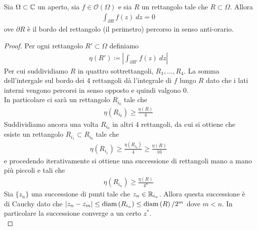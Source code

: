 \begin{theorem}[di Goursat]
	\label{thr:groursat}
	Sia $\Omega \subset \mathbb{C}$ un aperto, sia $f \in \mathcal{O}(\Omega)$ e sia $R$ un rettangolo tale che $R \subset \Omega$. Allora 
	\begin{equation*}
	\begin{aligned}
	\int_{\partial R} f(z)\ dz = 0
	\end{aligned}
	\end{equation*}
	ove $\partial R$ è il bordo del rettangolo (il perimetro) percorso in senso anti-orario.
\end{theorem}
\begin{proof}
	Per ogni rettangolo $R' \subset \Omega$ definiamo 
	\begin{equation*}
	\begin{aligned}
	\eta(R') \coloneqq \left| \int_{\partial R'} f(z)\ dz\right|
	\end{aligned}
	\end{equation*}
	Per cui suddividiamo $R$ in quattro sottrettangoli, $R_1, \dots, R_4$. La somma dell'intergale sul bordo dei 4 rettangoli dà l'integrale di $f$ lungo $R$ dato che i lati interni vengono percorsi in senso opposto e quindi valgono $0$. \\
	In particolare ci sarà un rettangolo $R_{i_0}$ tale che 
	\begin{equation*}
	\begin{aligned}	
	\eta(R_{i_0}) \ge \frac{\eta(R)}{4} 
	\end{aligned}
	\end{equation*}
	Suddividiamo ancora una volta $R_{i_0}$ in altri $4$ rettangoli, da cui si ottiene che esiste un rettangolo $R_{i_1} \subset R_{i_0}$ tale che 
	\begin{equation*}
	\begin{aligned}
	\eta(R_{i_1}) \ge \frac{\eta(R_{i_0})}{4} \ge \frac{\eta(R)}{16} 
	\end{aligned}
	\end{equation*}
	e procedendo iterativamente si ottiene una successione di rettangoli mano a mano più piccoli e tali che 
	\begin{equation*}
	\begin{aligned}	
	\eta(R_{i_n}) \ge \frac{\eta(R)}{4^n}
	\end{aligned}
	\end{equation*}
	Sia $\{z_n\}$ una successione di punti tale che $z_n \in \mathbb{R}_{i_n}$. Allora questa successione è di Cauchy dato che $|z_n - z_m| \le \operatorname{diam}\left(R_{i_n}\right) \le \operatorname{diam}\left(R\right)/2^m$ dove $m < n$. In particolare la successione converge a un certo $z^*$.\\

\end{proof}
